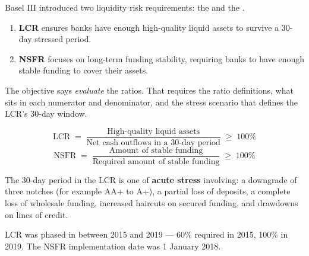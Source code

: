 Basel III introduced two liquidity risk requirements: the  and the .

\begin{enumerate}
\item \textbf{LCR} ensures banks have enough high-quality liquid assets to survive a 30-day stressed period.
\item \textbf{NSFR} focuses on long-term funding stability, requiring banks to have enough stable funding to cover their assets.
\end{enumerate}

\gapbadge
{}

\begin{lrgapbox}
The objective says \emph{evaluate} the ratios. That requires the ratio definitions, what sits in each numerator and denominator, and the stress scenario that defines the LCR's 30-day window.
\end{lrgapbox}

\begin{lrfmlbox}
\[ \text{LCR} \;=\; \frac{\text{High-quality liquid assets}}{\text{Net cash outflows in a 30-day period}} \;\geq\; 100\% \]
\[ \text{NSFR} \;=\; \frac{\text{Amount of stable funding}}{\text{Required amount of stable funding}} \;\geq\; 100\% \]
\end{lrfmlbox}

\begin{lrkeybox}
The 30-day period in the LCR is one of \textbf{acute stress} involving: a downgrade of three notches (for example AA+ to A+), a partial loss of deposits, a complete loss of wholesale funding, increased haircuts on secured funding, and drawdowns on lines of credit.

LCR was phased in between 2015 and 2019 — 60\% required in 2015, 100\% in 2019. The NSFR implementation date was 1 January 2018.
\end{lrkeybox}

